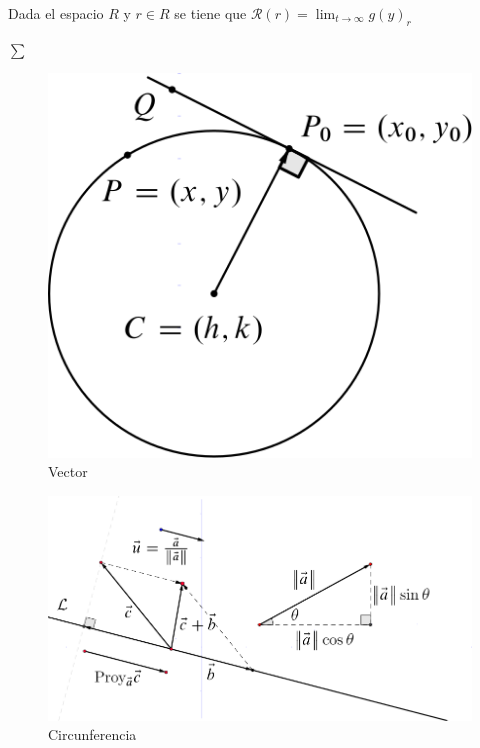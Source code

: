 \documentclass[10pt,]{krantz}
\let\oldincludegraphics\includegraphics
\renewcommand\includegraphics[2][]{%
  \oldincludegraphics[scale=0.85]{#2}
}
\theoremstyle{definition}
\theoremstyle{definition}
\theoremstyle{definition}
\theoremstyle{remark}
\let\BeginKnitrBlock\begin \let\EndKnitrBlock\end
\begin{document}
\BeginKnitrBlock{theorem}[russ]
\protect\hypertarget{thm:www}{}{\label{thm:www} {} }Dada el espacio \(R\) y \(r\in R\) se tiene que \(\mathcal{R}(r)=\lim_{t\to\infty}g(y)_r\)
\EndKnitrBlock{theorem}

\(\sum\)

\begin{figure}

{\centering \includegraphics{circunferencia} 

}

\caption{Vector}\label{fig:C1}
\end{figure}

\begin{figure}

{\centering \includegraphics{vector} 

}

\caption{Circunferencia}\label{fig:C2}
\end{figure}
\end{document}
